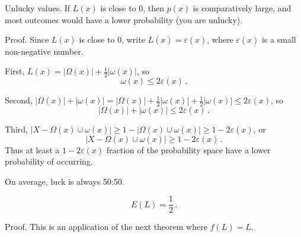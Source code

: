 \begin{theorem}{Unlucky values.}
If $L(x)$ is close to 0, then $p(x)$ is comparatively large, and most outcomes would have a lower probability (you are unlucky).

Proof.  Since $L(x)$ is close to 0, write $L(x)=\varepsilon(x)$, where $\varepsilon(x)$ is a small non-negative number.

First, $L(x)=|\Omega(x)|+\frac{1}{2}|\omega(x)|$, so
\begin{equation*}
\omega(x) \leq 2\varepsilon(x) \,.
\end{equation*}

Second, $|\Omega(x)|+|\omega(x)|=|\Omega(x)|+\frac{1}{2}|\omega(x)|+\frac{1}{2}|\omega(x)| \leq 2\varepsilon(x)$, so
\begin{equation*}
|\Omega(x)|+|\omega(x)| \leq 2\varepsilon(x) \,.
\end{equation*}

Third, $|X-\Omega(x) \cup \omega(x)| \geq 1-|\Omega(x) \cup \omega(x)| \geq 1-2\varepsilon(x)$, or 
\begin{equation*}
|X-\Omega(x) \cup \omega(x)| \geq 1-2\varepsilon(x) \,.
\end{equation*}
Thus at least a $1-2 \varepsilon(x)$ fraction of the probability space have a lower probability of occurring.
\end{theorem}

\begin{theorem}{On average, luck is always 50:50.}

\begin{equation*}
E(L)=\frac{1}{2} \,.
\end{equation*}

Proof.  This is an application of the next theorem where $f(L)=L$.
\end{theorem}

